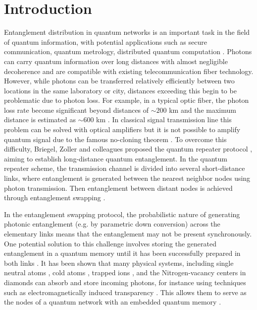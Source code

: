 \documentclass[%
  prx,%
  twocolumn,%
  preprintnumbers,%
  amsmath,%
  amssymb,%
  superscriptaddress%
]{revtex4}
\begin{document}
\maketitle


\section{Introduction}

Entanglement distribution in quantum networks is an important task in the field of quantum information, with potential applications such as secure communication, quantum metrology, distributed quantum computation \cite{Wei2022,Wehner2018,Azuma2023}. Photons can carry quantum information over long distances with almost negligible decoherence\cite{berera20,berera21} and are compatible with existing telecommunication fiber technology.
However, while photons can be transferred relatively efficiently between two locations in the same laboratory or city, distances exceeding this begin to be problematic due to photon loss.
For example, in a typical optic fiber, the photon loss rate become significant beyond distances of $ \sim 200 $ km and the maximum distance is estimated as $\sim 600$ km \cite{Pirandola2017, Yingqiu2021}.
In classical signal transmission line this problem can be solved with optical amplifiers but it is not possible to amplify quantum signal due to the famous no-cloning theorem \cite{Park1970, Wootters1982, Nielsen2010}. To overcome this difficulty, Briegel, Zoller and colleagues proposed the quantum repeater protocol \cite{Briegel1998},
aiming to establish long-distance quantum entanglement.
In the quantum repeater scheme, the transmission channel is divided into several short-distance links, where entanglement is generated between the nearest neighbor nodes using photon transmission.  Then entanglement between distant nodes is achieved through entanglement swapping \cite{bennett1993teleporting,zukowski1993event,Pan1998}.

In the entanglement swapping protocol, the probabilistic nature of generating photonic entanglement (e.g. by parametric down conversion) across the elementary links means that the entanglement may not be present synchronously.  One potential solution to this challenge involves storing the generated entanglement in a quantum memory until it has been successfully prepared in both links \cite{Lvovsky2009, Simon2010, Heshami2016}. It has been shown that many physical systems, including single neutral atoms \cite{Reiserer2015,Rosenfeld2008},
cold atoms \cite{Sangouard2011},
trapped ions \cite{Duan2010},
and the Nitrogen-vacancy centers in diamonds \cite{Childress2006, Gurudev2007,hermans2022qubit}
can absorb and store incoming photons,
for instance using techniques such as electromagnetically induced transparency \cite{Fleischhauer2005}.  This allows them to serve as the nodes of a quantum network with an embedded quantum memory \cite{Duan2001,Duan2010,Ritter2012}.
\end{document}

